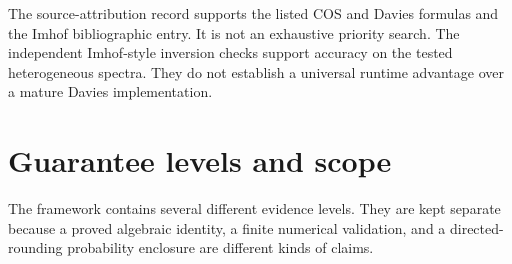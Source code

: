 The source-attribution record supports the listed COS and Davies formulas
and the Imhof bibliographic entry. It is not an exhaustive priority search.
The independent Imhof-style inversion checks support accuracy on the tested
heterogeneous spectra. They do not establish a universal runtime advantage
over a mature Davies implementation.


\section{Guarantee levels and scope}\label{sec:final-31}

The framework contains several different evidence levels.  They are kept
separate because a proved algebraic identity, a finite numerical validation,
and a directed-rounding probability enclosure are different kinds of claims.

